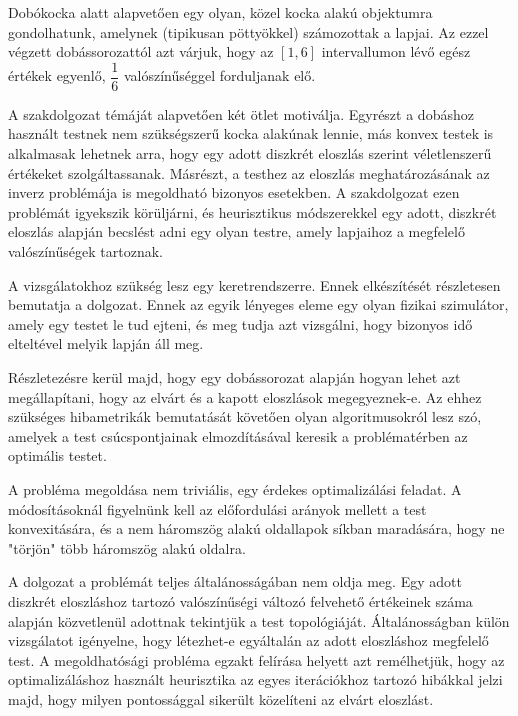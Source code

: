 
Dobókocka alatt alapvetően egy olyan, közel kocka alakú objektumra gondolhatunk, amelynek (tipikusan pöttyökkel) számozottak a lapjai. Az ezzel végzett dobássorozattól azt várjuk, hogy az $[1, 6]$ intervallumon lévő egész értékek egyenlő, $\dfrac{1}{6}$ valószínűséggel forduljanak elő.

A szakdolgozat témáját alapvetően két ötlet motiválja. Egyrészt a dobáshoz használt testnek nem szükségszerű kocka alakúnak lennie, más konvex testek is alkalmasak lehetnek arra, hogy egy adott diszkrét eloszlás szerint véletlenszerű értékeket szolgáltassanak. Másrészt, a testhez az eloszlás meghatározásának az inverz problémája is megoldható bizonyos esetekben.
A szakdolgozat ezen problémát igyekszik körüljárni, és heurisztikus módszerekkel egy adott, diszkrét eloszlás alapján becslést adni egy olyan testre, amely lapjaihoz a megfelelő valószínűségek tartoznak.

A vizsgálatokhoz szükség lesz egy keretrendszerre. Ennek elkészítését részletesen bemutatja a dolgozat. Ennek az egyik lényeges eleme egy olyan fizikai szimulátor, amely egy testet le tud ejteni, és meg tudja azt vizsgálni, hogy bizonyos idő elteltével melyik lapján áll meg.


Részletezésre kerül majd, hogy egy dobássorozat alapján hogyan lehet azt megállapítani, hogy az elvárt és a kapott eloszlások megegyeznek-e. Az ehhez szükséges hibametrikák bemutatását követően olyan algoritmusokról lesz szó, amelyek a test csúcspontjainak elmozdításával keresik a problématérben az optimális testet.

A probléma megoldása nem triviális, egy érdekes optimalizálási feladat.
A módosításoknál figyelnünk kell az előfordulási arányok mellett a test konvexitására, és a nem háromszög alakú oldallapok síkban maradására, hogy ne "törjön" több háromszög alakú oldalra.


A dolgozat a problémát teljes általánosságában nem oldja meg. Egy adott diszkrét eloszláshoz tartozó valószínűségi változó felvehető értékeinek száma alapján közvetlenül adottnak tekintjük a test topológiáját. Általánosságban külön vizsgálatot igényelne, hogy létezhet-e egyáltalán az adott eloszláshoz megfelelő test. A megoldhatósági probléma egzakt felírása helyett azt remélhetjük, hogy az optimalizáláshoz használt heurisztika az egyes iterációkhoz tartozó hibákkal jelzi majd, hogy milyen pontossággal sikerült közelíteni az elvárt eloszlást.

